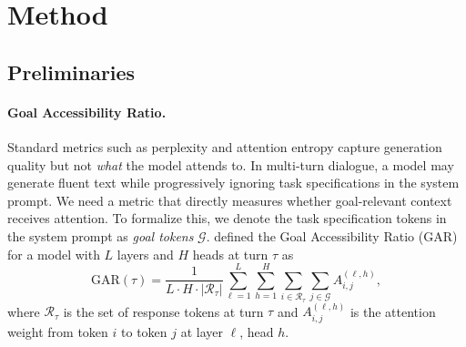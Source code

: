 \section{Method}\label{sec:method}

\subsection{Preliminaries}\label{sec:background}

\paragraph{Goal Accessibility Ratio.}
Standard metrics such as perplexity and attention entropy capture generation quality but not \emph{what} the model attends to. In multi-turn dialogue, a model may generate fluent text while progressively ignoring task specifications in the system prompt. We need a metric that directly measures whether goal-relevant context receives attention. To formalize this, we denote the task specification tokens in the system prompt as \emph{goal tokens} $\mathcal{G}$. \citet{dongre2026attention} defined the Goal Accessibility Ratio (GAR) for a model with $L$ layers and $H$ heads at turn $\tau$ as
\begin{equation}\label{eq:gar}
  \text{GAR}(\tau) = \frac{1}{L \cdot H \cdot |\mathcal{R}_\tau|} \sum_{\ell=1}^{L} \sum_{h=1}^{H} \sum_{i \in \mathcal{R}_\tau} \sum_{j \in \mathcal{G}} A_{i,j}^{(\ell,h)},
\end{equation}
where $\mathcal{R}_\tau$ is the set of response tokens at turn $\tau$ and $A_{i,j}^{(\ell,h)}$ is the attention weight from token $i$ to token $j$ at layer $\ell$, head $h$.

